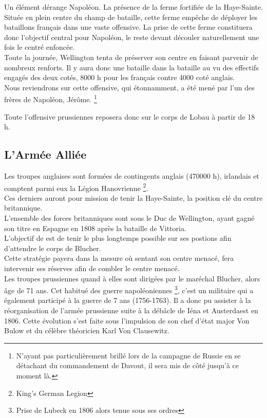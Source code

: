 Un élément dérange Napoléon. La présence de la ferme fortifiée de la Haye-Sainte. 
Située en plein centre du champ de bataille, cette ferme empêche de déployer les bataillons 
français dans une vaste offensive. La prise de cette ferme constituera donc l'objectif central pour 
Napoléon, le reste devant découler naturellement une fois le centré enfoncée. \\

Toute la journée, Wellington tenta de préserver son centre en faisant parvenir de nombreux renforts. 
Il y aura donc une bataille dans la bataille au vu des effectifs engagés des deux cotés, 8000 h pour 
les français contre 4000 coté anglais.\\

Nous reviendrons sur cette offensive, qui étonnamment, a été mené par l'un des frères de Napoléon, 
Jérôme. \footnote{N'ayant pas particulièrement brillé lors de la campagne de Russie en se détachant 
du commandement de Davout, il sera mis de côté jusqu'à ce moment là.}

Toute l'offensive prussiennes reposera donc sur le corps de Lobau à partir de 18 h.


\subsection{L'Armée Alliée}


Les troupes anglaises sont formées de contingents anglais (470000 h), irlandais et comptent parmi eux la 
Légion Hanovrienne \footnote{King's German Legion}.\\
Ces derniers auront pour mission de tenir la Haye-Sainte, la position clé du centre britannique.\\

L'ensemble des forces britanniques sont sous le Duc de Wellington, ayant gagné son titre en Espagne en 
1808 après la bataille de Vittoria.\\
L'objectif de \wel est de tenir le plus longtemps possible sur ses postions afin d'attendre le corps 
de Blucher. \\
Cette stratégie payera dans la mesure où sentant son centre menacé, \wel fera intervenir ses réserves 
afin de combler le centre menacé.\\


Les troupes prussiennes quand à elles sont dirigées par le maréchal Blucher, alors âge de 71 ans.
Cet habitué des guerre napoléoniennes \footnote{Prise de Lubeck en 1806 alors tenue sous ses ordres}, 
c'est un militaire qui a également participé à la guerre de 7 ans (1756-1763). Il a donc pu assister à 
la réorganisation de l'armée prussienne suite à la débâcle de Iéna et Austerdaest en 1806.
Cette évolution s'est faite sous l'impulsion de son chef d'état major Von Bulow et du célèbre 
théoricien Karl Von Clausewitz.\\

